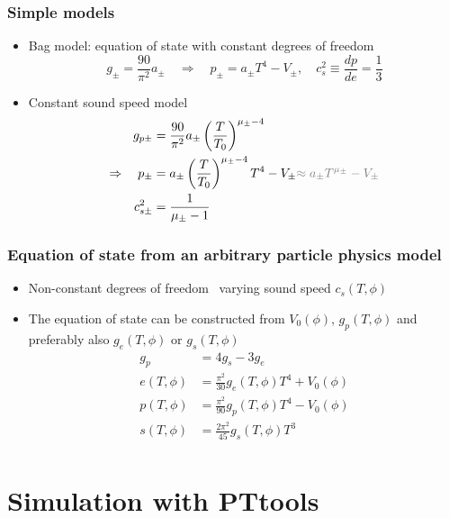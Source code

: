 \begin{frame}
    \frametitle{Simple models}
    \begin{itemize}
        \item Bag model: equation of state with constant degrees of freedom
        \begin{equation}
            g_\pm = \frac{90}{\pi^2} a_\pm \quad \Rightarrow \quad p_\pm = a_\pm T^4 - V_\pm, \quad
            c_s^2 \equiv \frac{dp}{de} = \frac{1}{3}
        \end{equation}
        \item Constant sound speed model
        \begin{align}
            g_{p\pm} &= \frac{90}{\pi^2} a_\pm \left( \frac{T}{T_0} \right)^{\mu_\pm - 4} \\
            \Rightarrow \quad
            p_\pm &= a_\pm \left( \frac{T}{T_0} \right)^{\mu_\pm - 4} T^4 - V_\pm {\color{gray} \approx a_\pm T^{\mu_\pm} - V_\pm } \\
            c_{s\pm}^2 &= \frac{1}{\mu_\pm - 1}
        \end{align}
    \end{itemize}
\end{frame}

\begin{frame}
    \frametitle{Equation of state from an arbitrary particle physics model}
    \begin{itemize}
        \item Non-constant degrees of freedom \textrightarrow \ varying sound speed $c_s(T,\phi)$
        \item The equation of state can be constructed from $V_0(\phi)$, $g_p(T,\phi)$ and preferably also $g_e(T,\phi)$ or $g_s(T,\phi)$
        \begin{align}
            g_p &= 4g_s - 3g_e \\
            e(T,\phi) &= \frac{\pi^2}{30} g_e(T,\phi) T^4 + V_0(\phi) \\
            p(T,\phi) &= \frac{\pi^2}{90} g_p(T,\phi) T^4 - V_0(\phi) \\
            s(T,\phi) &= \frac{2\pi^2}{45} g_s(T,\phi) T^3 \\
        \end{align}
    \end{itemize}
\end{frame}

\section{Simulation with PTtools}

